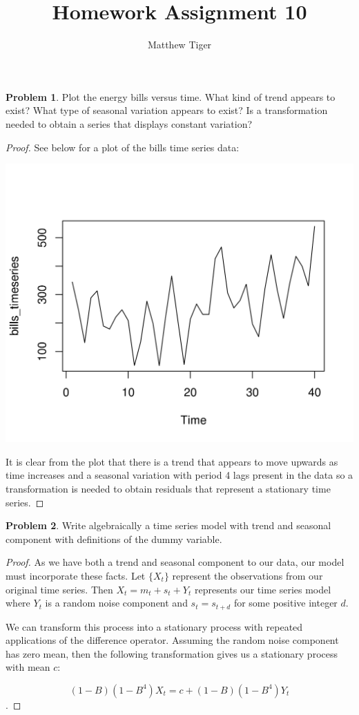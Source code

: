 \documentclass[12pt]{article}
\title{Homework Assignment 10}
\author{Matthew Tiger}
\theoremstyle{definition}
\newtheorem{problem}{Problem}
\begin{document}
\maketitle


\begin{problem}
  Plot the energy bills versus time. What kind of trend appears to exist? What type of seasonal
  variation appears to exist? Is a transformation needed to obtain a series that displays constant
  variation?
\end{problem}

\begin{proof}
  See below for a plot of the bills time series data:
  \vskip 0mm
  \begin{center}
  \includegraphics{timeseries}
  \end{center}
  \vskip 10mm

  It is clear from the plot that there is a trend that appears to move upwards
  as time increases and a seasonal variation with period 4
  lags present in the data so a transformation is needed to obtain residuals
  that represent a stationary time series.
\end{proof}


\begin{problem}
  Write algebraically a time series model with trend and seasonal component with definitions
  of the dummy variable.
\end{problem}

\begin{proof}
  As we have both a trend and seasonal component to our data, our model must
  incorporate these facts. Let $\{X_t\}$ represent the observations from our
  original time series. Then $X_t = m_t + s_t + Y_t$ represents our time series model
  where $Y_t$ is a random noise component and $s_t = s_{t+d}$ for some positive integer $d$.

  We can transform this process into a stationary process with repeated applications of the difference
  operator. Assuming the random noise component has zero mean, then the following transformation
  gives us a stationary process with mean $c$:

  $$(1-B)(1-B^4)X_t = c + (1-B)(1-B^4)Y_t$$.
\end{proof}
\end{document}
